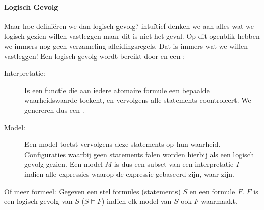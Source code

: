 \paragraph{Logisch Gevolg}
Maar hoe defini\"eren we dan logisch gevolg? intu\"itief denken we aan alles wat we logisch gezien willen vastleggen maar dit is niet het geval. Op dit ogenblik hebben we immers nog geen verzameling afleidingsregels. Dat is immers wat we willen vastleggen! Een logisch gevolg wordt bereikt door  en een :
\begin{description}
 \item[Interpretatie:]Is een functie die aan iedere atomaire formule een bepaalde waarheidswaarde toekent, en vervolgens alle statements coontroleert. We genereren dus een .
 \item[Model:]Een model toetst vervolgens deze statements op hun waarheid. Configuraties waarbij geen statements falen worden hierbij als een logisch gevolg gezien. Een model $M$ is dus een subset van een interpretatie $I$ indien alle expressies waarop de expressie gebaseerd zijn, waar zijn.
\end{description}
Of meer formeel: Gegeven een stel formules (statements) $S$ en een formule $F$. $F$ is een logisch gevolg van $S$ ($S\vDash F$) indien elk model van $S$ ook $F$ waarmaakt.
